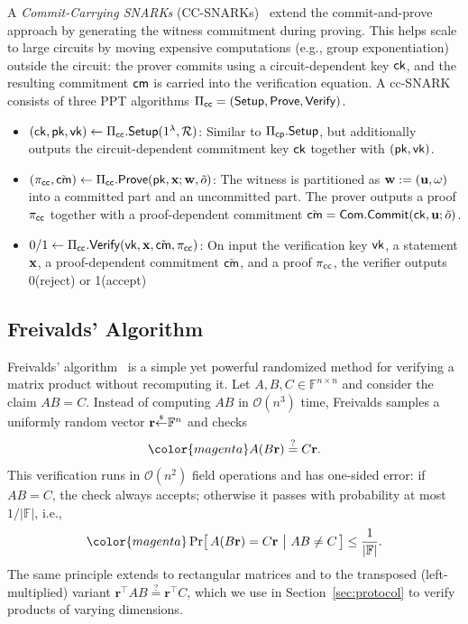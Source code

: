 \documentclass[sigconf,anonymous,review,balance=false]{acmart}
\newcommand{\rev}[1]{{\color{magenta}#1}}
\begin{document}
A \textit{Commit-Carrying SNARKs} (CC-SNARKs)~\cite{Legosnark, Vectis} extend the commit-and-prove approach by generating the witness commitment during proving. This helps scale to large circuits by moving expensive computations (e.g., group exponentiation) outside the circuit: the prover commits using a circuit-dependent key ${\sf ck}$, and the resulting commitment ${\sf cm}$ is carried into the verification equation. A cc-SNARK consists of three PPT algorithms $\Pi_{{\sf cc}}=({\sf Setup},{\sf Prove},{\sf Verify})$.

\begin{itemize}
    \item $({\sf ck}, {\sf pk}, {\sf vk}) \gets \Pi_{\sf cc}.{\sf Setup}(1^\lambda, {\mathcal{R}})$: Similar to $\Pi_{\sf cp}.{\sf Setup}$, but additionally outputs the circuit-dependent commitment key ${\sf ck}$ together with $({\sf pk},{\sf vk})$.
    \item $(\pi_{\sf cc}, \tilde{{\sf cm}}) \gets \Pi_{\sf cc}.{\sf Prove}({\sf pk}, {\mathbf{x}}; {\mathbf{w}}, \tilde{o})$: The witness is partitioned as ${\mathbf{w}} := ({\mathbf{u}},{\mathbf{\omega}})$ into a committed part and an uncommitted part.
    The prover outputs a proof $\pi_{\sf cc}$ together with a proof-dependent commitment $\tilde{{\sf cm}} ={\sf Com}.{\sf Commit}({\sf ck}, {\mathbf{u}}; \tilde{o})$.
    \item $0/1 \gets \Pi_{\sf cc}.{\sf Verify}({\sf vk}, {\mathbf{x}}, \tilde{{\sf cm}}, \pi_{\sf cc})$: On input the verification key ${\sf vk}$, a statement ${\mathbf{x}}$, a proof-dependent commitment $\tilde{{\sf cm}}$, and a proof $\pi_{\sf cc}$, the verifier outputs 0(reject) or 1(accept)
\end{itemize}


\subsection{Freivalds’ Algorithm}
Freivalds' algorithm~\cite{Freivalds, Korec} is a simple yet powerful randomized method for verifying a matrix product without recomputing it.
\rev{Let \(A,B,C\in \mathbb{F}^{n\times n}\) and consider the claim \(AB=C\).}
Instead of computing \rev{\(AB\)} in \(\mathcal{O}(n^3)\) time, Freivalds samples a uniformly random vector \(\mathbf{r}{\overset{{\scriptscriptstyle\$}}{\leftarrow}} \mathbb{F}^n\) and checks
\[
\rev{A(B\mathbf{r}) \stackrel{?}{=} C\mathbf{r}.}
\]
\rev{This verification runs in $\mathcal{O}(n^2)$ field operations and has one-sided error: if $AB=C$, the check always accepts; otherwise it passes with probability at most $1/|\mathbb{F}|$, i.e.,}
\[
\rev{\Pr\!\big[\,A(B\mathbf{r}) = C\mathbf{r}\ \big|\ AB\neq C\,\big] \le \frac{1}{|\mathbb{F}|}.}
\]
The same principle extends to rectangular matrices and to the transposed (left-multiplied) variant \rev{$\mathbf{r}^{\top}\!AB \stackrel{?}{=} \mathbf{r}^{\top}\!C$}, which we use in Section~\ref{sec:protocol} to verify products of varying dimensions.
\end{document}
